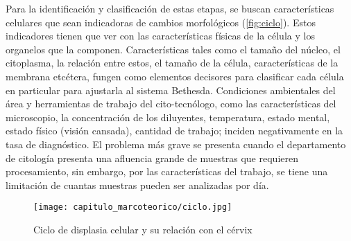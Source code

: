 \begin{table}[H]
    \centering
    \caption{Niveles del sistema Bethesda de reporte cervical y citológico}\label{tabla:bethesda}
    \end{table}

Para la identificación y clasificación de estas etapas, se buscan
características celulares que sean indicadoras de cambios morfológicos
(\autoref{fig:ciclo}). Estos indicadores tienen que ver con las características
físicas de la célula y los organelos que la componen. Características tales como
el tamaño del núcleo, el citoplasma, la relación entre estos, el tamaño de la
célula, características de la membrana etcétera, fungen como elementos decisores
para clasificar cada célula en particular para ajustarla al sistema Bethesda.
Condiciones ambientales del área y herramientas de trabajo del cito-tecnólogo,
como las características del microscopio, la concentración de los diluyentes,
temperatura, estado mental, estado físico (visión cansada), cantidad de trabajo;
inciden negativamente en la tasa de diagnóstico. El problema más grave se
presenta cuando el departamento de citología presenta una afluencia grande de
muestras que requieren procesamiento, sin embargo, por las características del
trabajo, se tiene una limitación de cuantas muestras pueden ser analizadas por
día.~\cite{Kurman1995}

\begin{figure}[H]
    \centering
    \texttt{[image: capitulo\_marcoteorico/ciclo.jpg]}
    \caption{Ciclo de displasia celular y su relación con el cérvix}\label{fig:ciclo}
\end{figure}